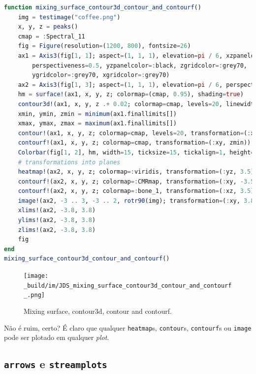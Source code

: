 \documentclass[
  notoc %
]{tufte-book}
\newcommand{\passthrough}[1]{#1}
\begin{document}
\begin{lstlisting}[language=Julia]
function mixing_surface_contour3d_contour_and_contourf()
    img = testimage("coffee.png")
    x, y, z = peaks()
    cmap = :Spectral_11
    fig = Figure(resolution=(1200, 800), fontsize=26)
    ax1 = Axis3(fig[1, 1]; aspect=(1, 1, 1), elevation=pi / 6, xzpanelcolor=(:black, 0.75),
        perspectiveness=0.5, yzpanelcolor=:black, zgridcolor=:grey70,
        ygridcolor=:grey70, xgridcolor=:grey70)
    ax2 = Axis3(fig[1, 3]; aspect=(1, 1, 1), elevation=pi / 6, perspectiveness=0.5)
    hm = surface!(ax1, x, y, z; colormap=(cmap, 0.95), shading=true)
    contour3d!(ax1, x, y, z .+ 0.02; colormap=cmap, levels=20, linewidth=2)
    xmin, ymin, zmin = minimum(ax1.finallimits[])
    xmax, ymax, zmax = maximum(ax1.finallimits[])
    contour!(ax1, x, y, z; colormap=cmap, levels=20, transformation=(:xy, zmax))
    contourf!(ax1, x, y, z; colormap=cmap, transformation=(:xy, zmin))
    Colorbar(fig[1, 2], hm, width=15, ticksize=15, tickalign=1, height=Relative(0.35))
    # transformations into planes
    heatmap!(ax2, x, y, z; colormap=:viridis, transformation=(:yz, 3.5))
    contourf!(ax2, x, y, z; colormap=:CMRmap, transformation=(:xy, -3.5))
    contourf!(ax2, x, y, z; colormap=:bone_1, transformation=(:xz, 3.5))
    image!(ax2, -3 .. 3, -3 .. 2, rotr90(img); transformation=(:xy, 3.8))
    xlims!(ax2, -3.8, 3.8)
    ylims!(ax2, -3.8, 3.8)
    zlims!(ax2, -3.8, 3.8)
    fig
end
mixing_surface_contour3d_contour_and_contourf()
\end{lstlisting}

\begin{figure}
\hypertarget{fig:mixing_surface_contour3d_contour_and_contourf}{%
\centering
\texttt{[image: \_build/im/JDS\_mixing\_surface\_contour3d\_contour\_and\_contourf\_.png]}
\caption{Mixing surface, contour3d, contour and
contourf.}\label{fig:mixing_surface_contour3d_contour_and_contourf}
}
\end{figure}

Não é ruim, certo? É claro que qualquer
\passthrough{\lstinline!heatmap!}s, \passthrough{\lstinline!contour!}s,
\passthrough{\lstinline!contourf!}s ou \passthrough{\lstinline!image!}
pode ser plotado em qualquer \emph{plot}.

\hypertarget{arrows-e-streamplots}{%
\subsection{\texorpdfstring{\texttt{arrows} e
\texttt{streamplots}}{arrows e streamplots}}\label{arrows-e-streamplots}}
\end{document}
